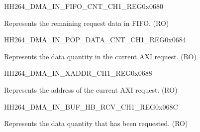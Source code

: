     \begin{register}{H}{H264\_DMA\_IN\_FIFO\_CNT\_CH1\_REG}{0x0680}\label{regdesc:H264DMAINFIFOCNTCH1REG}
    \regnewline%
    \begin{regdesc}\begin{reglist}
    \label{fielddesc:H264DMAINCMDFIFOINFIFOCNTCH1}\item [H264\_DMA\_IN\_CMDFIFO\_INFIFO\_CNT\_CH1] Represents the remaining request data in FIFO. (RO)
    \end{reglist}\end{regdesc}
    \end{register}
    
    
    \begin{register}{H}{H264\_DMA\_IN\_POP\_DATA\_CNT\_CH1\_REG}{0x0684}\label{regdesc:H264DMAINPOPDATACNTCH1REG}
    \regnewline%
    \begin{regdesc}\begin{reglist}
    \label{fielddesc:H264DMAINCMDFIFOPOPDATACNTCH1}\item [H264\_DMA\_IN\_CMDFIFO\_POP\_DATA\_CNT\_CH1] Represents the data quantity in the current AXI request. (RO)
    \end{reglist}\end{regdesc}
    \end{register}
    
    
    \begin{register}{H}{H264\_DMA\_IN\_XADDR\_CH1\_REG}{0x0688}\label{regdesc:H264DMAINXADDRCH1REG}
    \regnewline%
    \begin{regdesc}\begin{reglist}
    \label{fielddesc:H264DMAINCMDFIFOXADDRCH1}\item [H264\_DMA\_IN\_CMDFIFO\_XADDR\_CH1] Represents the address of the current AXI request. (RO)
    \end{reglist}\end{regdesc}
    \end{register}
    
    
    \begin{register}{H}{H264\_DMA\_IN\_BUF\_HB\_RCV\_CH1\_REG}{0x068C}\label{regdesc:H264DMAINBUFHBRCVCH1REG}
    \regnewline%
    \begin{regdesc}\begin{reglist}
    \label{fielddesc:H264DMAINCMDFIFOBUFHBRCVCH1}\item [H264\_DMA\_IN\_CMDFIFO\_BUF\_HB\_RCV\_CH1] Represents the data quantity that has been requested. (RO)
    \end{reglist}\end{regdesc}
    \end{register}
    

